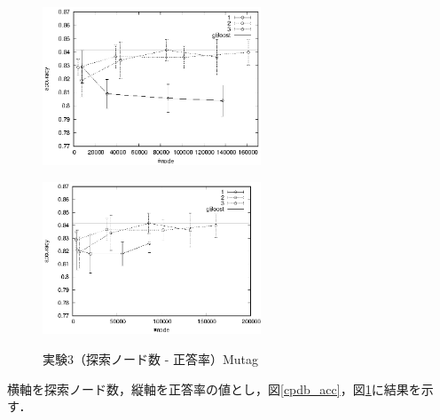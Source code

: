 \begin{figure}[t]
	\begin{minipage}{0.5\hsize}
		\begin{center}
			\includegraphics[width=65mm]{mutag/node_acc.eps}
		\end{center}
		\vspace{0.5cm}
		\label{fig:12}
	\end{minipage}
	\begin{minipage}{0.5\hsize}
		\begin{center}
			\includegraphics[width=65mm]{mutag/node_acc_para.eps}
		\end{center}
		\vspace{0.5cm}
		\label{fig:13}
	\end{minipage}
	\caption{実験3（探索ノード数 - 正答率）Mutag}
	\label{mutag_acc}
\end{figure}
横軸を探索ノード数，縦軸を正答率の値とし，図\ref{cpdb_acc}，図\ref{mutag_acc}に結果を示す．

